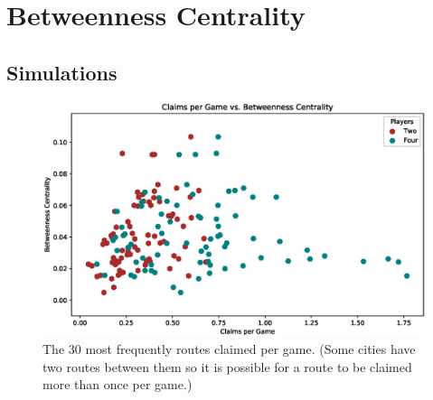 \section{Betweenness Centrality}

\subsection{Simulations}

\begin{figure}[!ht]
\centering
\includegraphics[scale=.6]{figures/betweenness.eps}
\caption{The 30 most frequently routes claimed
per game.
(Some cities have two routes between them so it is
possible for a route to be claimed more than once per game.)}
\label{fig:routes}
\end{figure}